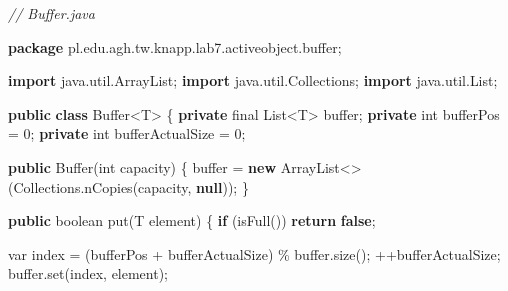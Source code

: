 \documentclass[11pt]{article}
\newenvironment{Shaded}{}{}
\newcommand{\KeywordTok}[1]{\textcolor[rgb]{0.00,0.44,0.13}{\textbf{{#1}}}}
\newcommand{\DataTypeTok}[1]{\textcolor[rgb]{0.56,0.13,0.00}{{#1}}}
\newcommand{\DecValTok}[1]{\textcolor[rgb]{0.25,0.63,0.44}{{#1}}}
\newcommand{\CommentTok}[1]{\textcolor[rgb]{0.38,0.63,0.69}{\textit{{#1}}}}
\newcommand{\FunctionTok}[1]{\textcolor[rgb]{0.02,0.16,0.49}{{#1}}}
\newcommand{\NormalTok}[1]{{#1}}
\newcommand{\ImportTok}[1]{{#1}}
\newcommand{\ControlFlowTok}[1]{\textcolor[rgb]{0.00,0.44,0.13}{\textbf{{#1}}}}
\newcommand{\OperatorTok}[1]{\textcolor[rgb]{0.40,0.40,0.40}{{#1}}}
\newcommand{\BuiltInTok}[1]{{#1}}
\begin{document}
\begin{Shaded}
\begin{Highlighting}[]
\CommentTok{// Buffer.java}

\KeywordTok{package}\ImportTok{ pl}\OperatorTok{.}\ImportTok{edu}\OperatorTok{.}\ImportTok{agh}\OperatorTok{.}\ImportTok{tw}\OperatorTok{.}\ImportTok{knapp}\OperatorTok{.}\ImportTok{lab7}\OperatorTok{.}\ImportTok{activeobject}\OperatorTok{.}\ImportTok{buffer}\OperatorTok{;}

\KeywordTok{import} \ImportTok{java}\OperatorTok{.}\ImportTok{util}\OperatorTok{.}\ImportTok{ArrayList}\OperatorTok{;}
\KeywordTok{import} \ImportTok{java}\OperatorTok{.}\ImportTok{util}\OperatorTok{.}\ImportTok{Collections}\OperatorTok{;}
\KeywordTok{import} \ImportTok{java}\OperatorTok{.}\ImportTok{util}\OperatorTok{.}\ImportTok{List}\OperatorTok{;}

\KeywordTok{public} \KeywordTok{class} \BuiltInTok{Buffer}\OperatorTok{\textless{}}\NormalTok{T}\OperatorTok{\textgreater{}} \OperatorTok{\{}
    \KeywordTok{private} \DataTypeTok{final} \BuiltInTok{List}\OperatorTok{\textless{}}\NormalTok{T}\OperatorTok{\textgreater{}}\NormalTok{ buffer}\OperatorTok{;}
    \KeywordTok{private} \DataTypeTok{int}\NormalTok{ bufferPos }\OperatorTok{=} \DecValTok{0}\OperatorTok{;}
    \KeywordTok{private} \DataTypeTok{int}\NormalTok{ bufferActualSize }\OperatorTok{=} \DecValTok{0}\OperatorTok{;}

    \KeywordTok{public} \BuiltInTok{Buffer}\OperatorTok{(}\DataTypeTok{int}\NormalTok{ capacity}\OperatorTok{)} \OperatorTok{\{}
\NormalTok{        buffer }\OperatorTok{=} \KeywordTok{new} \BuiltInTok{ArrayList}\OperatorTok{\textless{}\textgreater{}(}\BuiltInTok{Collections}\OperatorTok{.}\FunctionTok{nCopies}\OperatorTok{(}\NormalTok{capacity}\OperatorTok{,} \KeywordTok{null}\OperatorTok{));}
    \OperatorTok{\}}

    \KeywordTok{public} \DataTypeTok{boolean} \FunctionTok{put}\OperatorTok{(}\NormalTok{T element}\OperatorTok{)} \OperatorTok{\{}
        \ControlFlowTok{if} \OperatorTok{(}\FunctionTok{isFull}\OperatorTok{())}
            \ControlFlowTok{return} \KeywordTok{false}\OperatorTok{;}

        \DataTypeTok{var}\NormalTok{ index }\OperatorTok{=} \OperatorTok{(}\NormalTok{bufferPos }\OperatorTok{+}\NormalTok{ bufferActualSize}\OperatorTok{)} \OperatorTok{\%}\NormalTok{ buffer}\OperatorTok{.}\FunctionTok{size}\OperatorTok{();}
        \OperatorTok{++}\NormalTok{bufferActualSize}\OperatorTok{;}
\NormalTok{        buffer}\OperatorTok{.}\FunctionTok{set}\OperatorTok{(}\NormalTok{index}\OperatorTok{,}\NormalTok{ element}\OperatorTok{);}


\end{Highlighting}
\end{Shaded}
\end{document}
